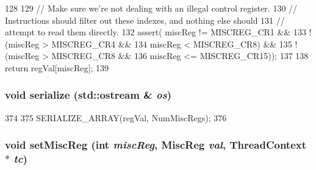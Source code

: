 \begin{DoxyCode}
128 {
129     // Make sure we're not dealing with an illegal control register.
130     // Instructions should filter out these indexes, and nothing else should
131     // attempt to read them directly.
132     assert( miscReg != MISCREG_CR1 &&
133             !(miscReg > MISCREG_CR4 &&
134               miscReg < MISCREG_CR8) &&
135             !(miscReg > MISCREG_CR8 &&
136               miscReg <= MISCREG_CR15));
137 
138     return regVal[miscReg];
139 }
\end{DoxyCode}
\hypertarget{classX86ISA_1_1ISA_a53e036786d17361be4c7320d39c99b84}{
\subsubsection[{serialize}]{\setlength{\rightskip}{0pt plus 5cm}void serialize (std::ostream \& {\em os})}}
\label{classX86ISA_1_1ISA_a53e036786d17361be4c7320d39c99b84}



\begin{DoxyCode}
374 {
375     SERIALIZE_ARRAY(regVal, NumMiscRegs);
376 }
\end{DoxyCode}
\hypertarget{classX86ISA_1_1ISA_acb55d95b5d0cf15e23c7cdcfe03074f1}{
\subsubsection[{setMiscReg}]{\setlength{\rightskip}{0pt plus 5cm}void setMiscReg (int {\em miscReg}, \/  {\bf MiscReg} {\em val}, \/  {\bf ThreadContext} $\ast$ {\em tc})}}
\label{classX86ISA_1_1ISA_acb55d95b5d0cf15e23c7cdcfe03074f1}



